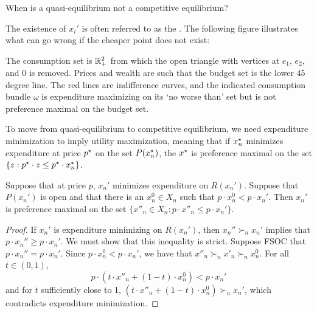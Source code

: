 \documentclass[10pt]{article}
\begin{document}
\begin{question}
	When is a quasi-equilibrium not a competitive equilibrium? 
\end{question}
\begin{remark}
	The existence of $x_i'$ is often referred to as the . The following figure illustrates what can go wrong if the cheaper point does not exist:
	\begin{figure}[H]
		\centering
	\end{figure}
	The consumption set is $\mathbb{R}^2_+$ from which the open triangle with vertices at $e_1$, $e_2$, and $0$ is removed. Prices and wealth are such that the budget set is the lower 45 degree line. The red lines are indifference curves, and the indicated consumption bundle $\omega$ is expenditure maximizing on its `no worse than' set but is not preference maximal on the budget set.
\end{remark}

\begin{remark}
	To move from quasi-equilibrium to competitive equilibrium, we need expenditure minimization to imply utility maximization, meaning that if $x_n^\star$ minimizes expenditure at price $p^\star$ on the set $P(x_n^\star)$, the $x^\star$ is preference maximal on the set $\{z : p^\star \cdot z \le p^\star \cdot x_n^\star\}$.
\end{remark}

\begin{lemma}\label{lem:cheaper_point}
	 Suppose that at price $p$, $x_n'$ minimizes expenditure on $R(x_n')$. Suppose that $P(x_n')$ is open and that there is an $x_n^0 \in X_n$ such that $p \cdot x_n^0 < p \cdot x_n'$. Then $x_n'$ is preference maximal on the set $\{x''_n \in X_n : p \cdot x''_n \le p \cdot x_n'\}$. 
\end{lemma}
\begin{proof}
	If $x_n'$ is expenditure minimizing on $R(x_n')$, then $x_n'' \succ_n x_n'$ implies that $p \cdot x_n'' \ge p \cdot x_n'$. We must show that this inequality is strict. Suppose FSOC that $p \cdot x_n'' = p \cdot x_n'$. Since $p \cdot x_n^0 < p \cdot x_n'$, we have that $x''_n \succ_n x'_n \succ_n x_n^0$. For all $t \in (0,1)$, \[p \cdot (t \cdot x''_n + (1-t) \cdot x_n^0) < p \cdot x_n'\]and for $t$ sufficiently close to 1, $(t \cdot x''_n + (1-t) \cdot x_n^0) \succ_n x_n'$, which contradicts expenditure minimization. 
\end{proof}
\end{document}
